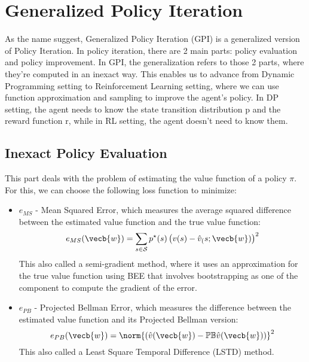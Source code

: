 \section{Generalized Policy Iteration}
\label{sec:generalized_policy_iteration}

As the name suggest, Generalized Policy Iteration (GPI) is a generalized version of Policy Iteration. 
In policy iteration, there are 2 main parts: policy evaluation and policy improvement. In GPI, the generalization refers to those 2 parts, where they're computed in an inexact way.
This enables us to advance from Dynamic Programming setting to Reinforcement Learning setting, where we can use function approximation and sampling to improve the agent's policy. In DP setting, the agent needs to know the state transition distribution p and the reward function r, while in RL setting, the agent doesn't need to know them.


\subsection{Inexact Policy Evaluation}
\label{sec:inexact_policy_evaluation}
This part deals with the problem of estimating the value function of a policy $\pi$. For this, we can choose the following loss function to minimize:
\begin{itemize}
  \item $e_{MS}$ - Mean Squared Error, which measures the average squared difference between the estimated value function and the true value function:
    \begin{equation}
        e_{MS}(\vecb{w}) = \sum_{s \in \mathcal{S}} p^\star(s) \left( v(s) - \hat{v}_(s; \vecb{w}) \right)^2
    \end{equation}
  This also called a semi-gradient method, where it uses an approximation for the true value function using BEE that involves bootstrapping as one of the component to compute the gradient of the error. 
  \item $e_{PB}$ - Projected Bellman Error, which measures the difference between the estimated value function and its Projected Bellman version:
    \begin{equation}
        e_{PB}(\vecb{w}) =  \norm{ \left( \hat{v}(\vecb{w}) - \mathbb{P} \mathbb{B} \hat{v}(\vecb{w}) \right)}^2
    \end{equation}
  This also called a Least Square Temporal Difference (LSTD) method.
\end{itemize}


